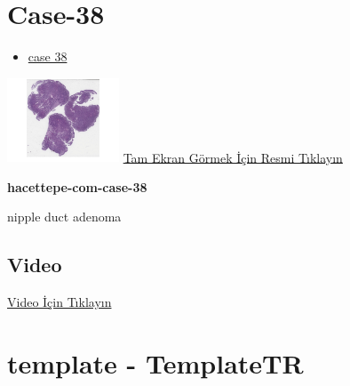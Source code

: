 \documentclass[
  letterpaper,
  DIV=11,
  numbers=noendperiod]{scrreprt}
\providecommand{\tightlist}{%
  \setlength{\itemsep}{0pt}\setlength{\parskip}{0pt}}\usepackage{longtable,booktabs,array}
\begin{document}
\hypertarget{sec-hacettepe-case-of-the-month-case-38}{%
\section{Case-38}\label{sec-hacettepe-case-of-the-month-case-38}}

\begin{itemize}
\tightlist
\item
  \href{https://www.youtube.com/watch?v=hhO5QsqIPFg&ab_channel=KemalKosemehmetoglu}{case
  38}
\end{itemize}

\href{https://images.patolojiatlasi.com/hacettepe-com-case-38/HE.html}{\includegraphics[width=0.25\textwidth,height=\textheight]{./screenshots/thumbnail_hacettepe-com-case-38.png}}
\href{https://images.patolojiatlasi.com/hacettepe-com-case-38/HE.html}{Tam
Ekran Görmek İçin Resmi Tıklayın}

\textbf{hacettepe-com-case-38}

\begin{tcolorbox}[enhanced jigsaw, breakable, opacitybacktitle=0.6, arc=.35mm, colbacktitle=quarto-callout-tip-color!10!white, colback=white, toptitle=1mm, left=2mm, opacityback=0, colframe=quarto-callout-tip-color-frame, titlerule=0mm, rightrule=.15mm, bottomrule=.15mm, toprule=.15mm, bottomtitle=1mm, title=\textcolor{quarto-callout-tip-color}{\faLightbulb}\hspace{0.5em}{Tanı}, coltitle=black, leftrule=.75mm]

nipple duct adenoma

\end{tcolorbox}

\hypertarget{video-37}{%
\subsection{Video}\label{video-37}}

\href{https://www.youtube.com/watch?v=hhO5QsqIPFg}{Video İçin Tıklayın}

\hypertarget{sec-template}{%
\section{template - TemplateTR}\label{sec-template}}
\end{document}
